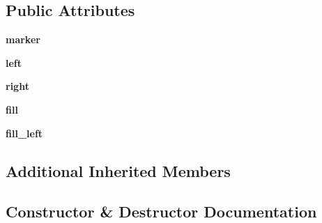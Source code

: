 \subsection*{Public Attributes}
\begin{DoxyCompactItemize}
\item 
{\bfseries marker}\hypertarget{class_libraries_1_1_fast_progress_bar_1_1_bar_ab96b1aa7326df1bcc54028f81bf3fa2d}{}\label{class_libraries_1_1_fast_progress_bar_1_1_bar_ab96b1aa7326df1bcc54028f81bf3fa2d}

\item 
{\bfseries left}\hypertarget{class_libraries_1_1_fast_progress_bar_1_1_bar_ab3dc0c1442161edb93bb5470424c9eb3}{}\label{class_libraries_1_1_fast_progress_bar_1_1_bar_ab3dc0c1442161edb93bb5470424c9eb3}

\item 
{\bfseries right}\hypertarget{class_libraries_1_1_fast_progress_bar_1_1_bar_a90915f4adf02f716ab36cd8180d67d7f}{}\label{class_libraries_1_1_fast_progress_bar_1_1_bar_a90915f4adf02f716ab36cd8180d67d7f}

\item 
{\bfseries fill}\hypertarget{class_libraries_1_1_fast_progress_bar_1_1_bar_ad85f02465a244cad4569cc89cd343955}{}\label{class_libraries_1_1_fast_progress_bar_1_1_bar_ad85f02465a244cad4569cc89cd343955}

\item 
{\bfseries fill\+\_\+left}\hypertarget{class_libraries_1_1_fast_progress_bar_1_1_bar_a62837b6e1056c57338a6d614e8f6833c}{}\label{class_libraries_1_1_fast_progress_bar_1_1_bar_a62837b6e1056c57338a6d614e8f6833c}

\end{DoxyCompactItemize}
\subsection*{Additional Inherited Members}


\subsection{Constructor \& Destructor Documentation}
